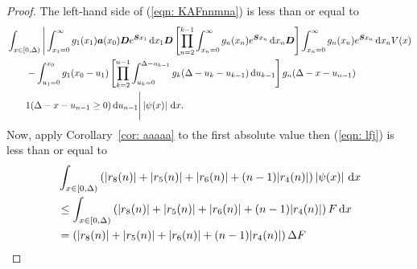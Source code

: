 \begin{proof}
	The left-hand side of (\ref{eqn: KAFnnmna}) is less than or equal to 
	\begin{align}
		& \int_{x\in[0,\Delta)} \Bigg| \int_{x_1=0}^\infty g_1(x_1) \boldsymbol a (x_0) \boldsymbol D e^{\boldsymbol{S}x_1}\, \mathrm{d} x_1\boldsymbol D 
            	\left[\prod_{n=2}^{k-1}\int_{x_n=0}^\infty g_n(x_n) e^{\boldsymbol{S}x_n} \, \mathrm{d} x_n
		\boldsymbol D\right]
            	\int_{x_n=0}^\infty g_{n}(x_n) e^{\boldsymbol{S}x_n} \, \mathrm{d} x_n V(x)  \nonumber 
		\\&\qquad {}- \int_{u_1=0}^{x_0}g_1(x_0 - u_1)
		\left[\prod_{k=2}^{n-1} \int_{u_k=0}^{\Delta-u_{k-1}} g_k(\Delta-u_k-u_{k-1})\, \mathrm{d} u_{k-1}\right] \nonumber 
            	g_{n}(\Delta - x-u_{n-1})
	\\&\qquad{} 1(\Delta-x-u_{n-1}\geq0)\, \mathrm{d} u_{n-1}\Bigg| \left|\psi(x)\right|\, \mathrm{d} x . \label{eqn: lfj}
	\end{align}
	Now, apply Corollary~\ref{cor: aaaaa} to the first absolute value then (\ref{eqn: lfj}) is less than or equal to 
	\begin{align}
		&\int_{x\in[0,\Delta)} \left(|r_8(n)|+|r_5(n)|+|r_6(n)| + (n-1)|r_4(n)|\right) \left|\psi(x)\right|\, \mathrm{d} x  \nonumber 
		\\&\leq \int_{x\in[0,\Delta)} \left(|r_8(n)|+|r_5(n)|+|r_6(n)| + (n-1)|r_4(n)|\right) F\, \mathrm{d} x  \nonumber 
		\\&=  \left(|r_8(n)|+|r_5(n)|+|r_6(n)| + (n-1)|r_4(n)|\right) \Delta F
	\end{align}
\end{proof}

